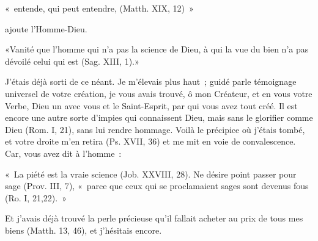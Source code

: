 \documentclass[french,twoside]{book} %
\newenvironment{quoteblock}%
  {\begin{quoting}}
  {\end{quoting}}
\newenvironment{quotebar}{%
    \def\FrameCommand{{\color{rubric!10!}\vrule width 0.5em} \hspace{0.9em}}%
    \def\OuterFrameSep{\itemsep} %
    \MakeFramed {\advance\hsize-\width \FrameRestore}
  }%
  {%
    \endMakeFramed
  }
\renewenvironment{quoteblock}%
  {%
    \savenotes
    \setstretch{0.9}
    \normalfont
    \begin{quotebar}
  }
  {%
    \end{quotebar}
    \spewnotes
  }
\begin{document}
\begin{quoteblock}
\noindent « entende, qui peut entendre, (Matth. XIX, 12) »\end{quoteblock}

\noindent ajoute l’Homme-Dieu.\par

\begin{quoteblock}
\noindent «Vanité que l’homme qui n’a pas la science de Dieu, à qui la vue du bien n’a pas dévoilé celui qui est (Sag. XIII, 1).»\end{quoteblock}

\noindent J’étais déjà sorti de ce néant. Je m’élevais plus haut ; guidé parle témoignage universel de votre création, je vous avais trouvé, ô mon Créateur, et en vous votre Verbe, Dieu un avec vous et le Saint-Esprit, par qui vous avez tout créé. Il est encore une autre sorte d’impies qui connaissent Dieu, mais sans le glorifier comme Dieu (Rom. I, 21), sans lui rendre hommage. Voilà le   précipice où j’étais tombé, et votre droite m’en retira (Ps. XVII, 36) et me mit en voie de convalescence. Car, vous avez dit à l’homme :\par

\begin{quoteblock}
\noindent « La piété est la vraie science (Job. XXVIII, 28). Ne désire point passer pour sage (Prov. III, 7), « parce que ceux qui se proclamaient sages sont devenus fous (Ro. I, 21,22). »\end{quoteblock}

\noindent Et j’avais déjà trouvé la perle précieuse qu’il fallait acheter au prix de tous mes biens (Matth. 13, 46), et j’hésitais encore.
\end{document}
